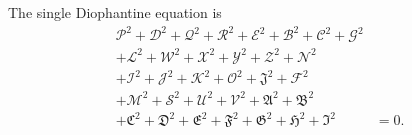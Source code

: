 The single Diophantine equation is
\[
\begin{split}
\mathcal{P}^2+\mathcal{D}^2+\mathcal{Q}^2+\mathcal{R}^2+\mathcal{E}^2+\mathcal{B}^2+\mathcal{C}^2+\mathcal{G}^2 &\\
+\mathcal{L}^2+\mathcal{W}^2+\mathcal{X}^2+\mathcal{Y}^2+\mathcal{Z}^2+\mathcal{N}^2 &\\
+\mathcal{I}^2+\mathcal{J}^2+\mathcal{K}^2+\mathcal{O}^2+\mathfrak{J}^2+\mathcal{F}^2 &\\
+\mathcal{M}^2+\mathcal{S}^2+\mathcal{U}^2+\mathcal{V}^2+\mathfrak{A}^2+\mathfrak{B}^2 &\\
+\mathfrak{C}^2+\mathfrak{D}^2+\mathfrak{E}^2+\mathfrak{F}^2+\mathfrak{G}^2+\mathfrak{H}^2+\mathfrak{I}^2 &= 0.
\end{split}
\]
